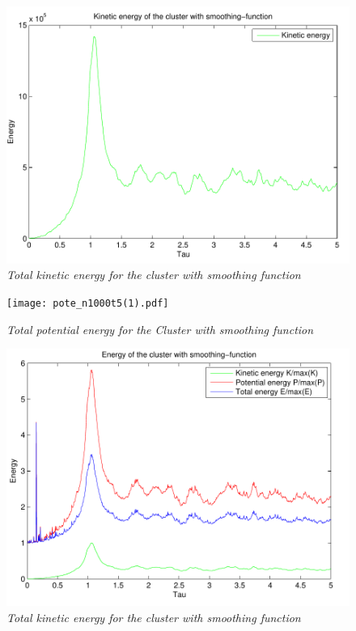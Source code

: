 \documentclass[a4paper,12pt, english]{article}
\begin{document}
\begin{figure}
	\includegraphics[scale=0.5]{kine_n1000t5.pdf}
	\caption{\textit{Total kinetic energy for the cluster with smoothing function}}
	\label{fig:sub2}
\end{figure}
\begin{figure}
	\texttt{[image: pote\_n1000t5(1).pdf]}
	\caption{\textit{Total potential energy for the Cluster with smoothing function}}
	\label{fig:pote}
\end{figure}



\begin{figure}
	\includegraphics[scale=0.5]{energy_n1000t5_N100.pdf}
	\caption{\textit{Total kinetic energy for the cluster with smoothing function}}
	\label{fig:sub2}
\end{figure}
\end{document}
